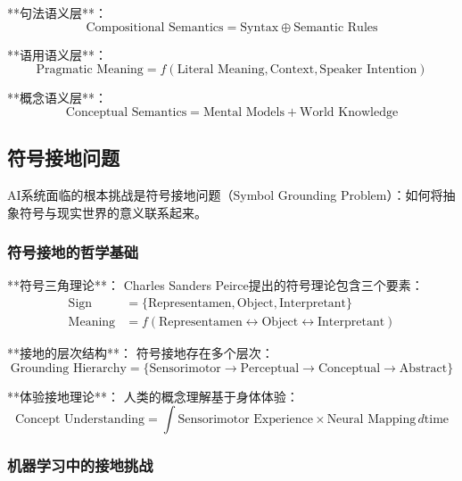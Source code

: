 **句法语义层**：
\begin{equation}
\text{Compositional Semantics} = \text{Syntax} \oplus \text{Semantic Rules}
\end{equation}

**语用语义层**：
\begin{equation}
\text{Pragmatic Meaning} = f(\text{Literal Meaning}, \text{Context}, \text{Speaker Intention})
\end{equation}

**概念语义层**：
\begin{equation}
\text{Conceptual Semantics} = \text{Mental Models} + \text{World Knowledge}
\end{equation}

\subsection{符号接地问题}

AI系统面临的根本挑战是符号接地问题（Symbol Grounding Problem）：如何将抽象符号与现实世界的意义联系起来。

\subsubsection{符号接地的哲学基础} %

**符号三角理论**：
Charles Sanders Peirce提出的符号理论包含三个要素：
\begin{align}
\text{Sign} &= \{\text{Representamen}, \text{Object}, \text{Interpretant}\} \\
\text{Meaning} &= f(\text{Representamen} \leftrightarrow \text{Object} \leftrightarrow \text{Interpretant})
\end{align}

**接地的层次结构**：
符号接地存在多个层次：
\begin{equation}
\text{Grounding Hierarchy} = \{\text{Sensorimotor} \rightarrow \text{Perceptual} \rightarrow \text{Conceptual} \rightarrow \text{Abstract}\}
\end{equation}

**体验接地理论**：
人类的概念理解基于身体体验：
\begin{equation}
\text{Concept Understanding} = \int \text{Sensorimotor Experience} \times \text{Neural Mapping} \, d\text{time}
\end{equation}

\subsubsection{机器学习中的接地挑战} %

